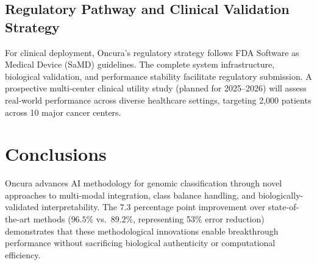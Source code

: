 \documentclass[manuscript, screen, review]{jair}
\begin{document}
\subsection{Regulatory Pathway and Clinical Validation Strategy}

For clinical deployment, Oncura's regulatory strategy follows FDA Software as Medical Device (SaMD) guidelines. The complete system infrastructure, biological validation, and performance stability facilitate regulatory submission. A prospective multi-center clinical utility study (planned for 2025--2026) will assess real-world performance across diverse healthcare settings, targeting 2,000 patients across 10 major cancer centers.

\section{Conclusions}
\label{sec:conclusions}

Oncura advances AI methodology for genomic classification through novel approaches to multi-modal integration, class balance handling, and biologically-validated interpretability. The 7.3 percentage point improvement over state-of-the-art methods ($96.5\%$ vs.\ $89.2\%$, representing 53\% error reduction) demonstrates that these methodological innovations enable breakthrough performance without sacrificing biological authenticity or computational efficiency.
\end{document}
